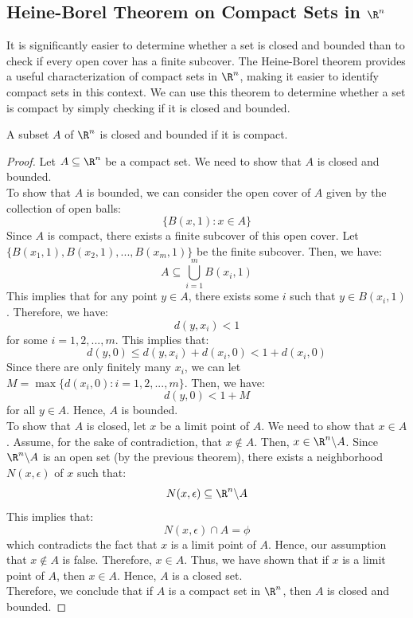 \documentclass[openany]{book}
\begin{document}
\subsection{Heine-Borel Theorem on Compact Sets in $\R^n$}
It is significantly easier to determine whether a set is closed and bounded than to check if every open cover has a finite subcover. The Heine-Borel theorem provides a useful characterization of compact sets in $\R^n$, making it easier to identify compact sets in this context. We can use this theorem to determine whether a set is compact by simply checking if it is closed and bounded.
\begin{mytheorem}
    A subset $A$ of $\R^n$ is closed and bounded if it is compact.
\end{mytheorem}
\begin{proof}
    Let $A \subseteq \R^n$ be a compact set. We need to show that $A$ is closed and bounded. \\
    To show that $A$ is bounded, we can consider the open cover of $A$ given by the collection of open balls:
    $$\{B(x, 1) : x \in A\}$$
    Since $A$ is compact, there exists a finite subcover of this open cover. Let $\{B(x_1, 1), B(x_2, 1), ..., B(x_m, 1)\}$ be the finite subcover. Then, we have:
    $$A \subseteq \bigcup_{i=1}^{m} B(x_i, 1)$$
    This implies that for any point $y \in A$, there exists some $i$ such that $y \in B(x_i, 1)$. Therefore, we have:
    $$d(y, x_i) < 1$$
    for some $i = 1, 2, ..., m$. This implies that:
    $$d(y, 0) \leq d(y, x_i) + d(x_i, 0) < 1 + d(x_i, 0)$$
    Since there are only finitely many $x_i$, we can let $M = \max\{d(x_i, 0) : i = 1, 2, ..., m\}$. Then, we have:
    $$d(y, 0) < 1 + M$$
    for all $y \in A$. Hence, $A$ is bounded. \\
    To show that $A$ is closed, let $x$ be a limit point of $A$. We need to show that $x \in A$. Assume, for the sake of contradiction, that $x \notin A$. Then, $x \in \R^n \backslash A$. Since $\R^n \backslash A$ is an open set (by the previous theorem), there exists a neighborhood $N(x, \epsilon)$ of $x$ such that:
    $$N(x, \epsilon) \subseteq \R^n \backslash A$$
    This implies that:
    $$N(x, \epsilon) \cap A = \phi$$
    which contradicts the fact that $x$ is a limit point of $A$. Hence, our assumption that $x \notin A$ is false. Therefore, $x \in A$. Thus, we have shown that if $x$ is a limit point of $A$, then $x \in A$. Hence, $A$ is a closed set. \\
    Therefore, we conclude that if $A$ is a compact set in $\R^n$, then $A$ is closed and bounded.
\end{proof}
\end{document}
